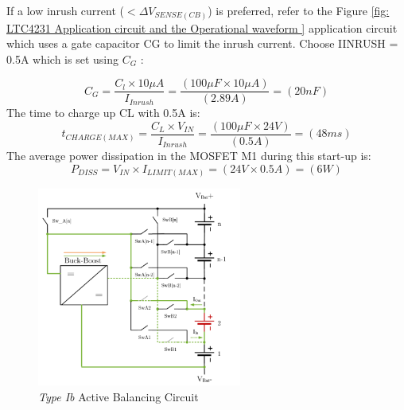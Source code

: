 If a low inrush current ($< \Delta V_{SENSE(CB)}$) is preferred, refer
to the Figure \ref{fig: LTC4231 Application circuit and the Operational waveform } application circuit which uses a gate capacitor CG to limit the inrush current. Choose IINRUSH = 0.5A
which is set using $C_G$ \cite{LTC4231_User_Datasheet}:

\begin{equation}\label{eq:LTC_Cg}
	C_{G} = \frac{ C_{l}\times 10\mu A}{I_{Inrush}} = \frac{\left(100\mu F \times 10\mu A \right)}{\left(2.89A \right)} = \left(20nF\right)
\end{equation}
The time to charge up CL with 0.5A is:
\begin{equation}\label{eq:LTC_Tcharge}
    t_{CHARGE(MAX)} = \frac{ C_{L}\times V_{IN}}{I_{Inrush}} = \frac{\left(100\mu F \times 24V \right)}{\left(0.5A \right)} = \left(48ms\right)
\end{equation}
The average power dissipation in the MOSFET M1 during this start-up is:
\begin{equation}\label{eq:LTC_Pdissp_average}
    P_{DISS} = V_{IN} \times I_{LIMIT(MAX)}  = \left(24V \times 0.5A\right) = \left(6W\right)
\end{equation}

\begin{figure}[h]
	\centering
	\includegraphics[width=0.6\textwidth]{Chap04/Figures/Type2a_ABMS.PNG}
	\caption{\textit{Type Ib} Active Balancing Circuit} 
	\label{fig:Type1b Active Balancing Circuit }
\end{figure}


